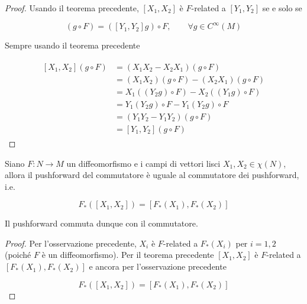 \begin{proof}
	Usando il teorema precedente, $ [X_{1},X_{2}] $ è $ F $-related a $ [Y_{1},Y_{2}] $ se e solo se
	
	\begin{equation}
		[X_{1},X_{2}](g \circ F) = ([Y_{1},Y_{2}] g) \circ F, \qquad \forall g \in C^{\infty}(M)
	\end{equation}

	Sempre usando il teorema precedente
	
	\begin{align}
		\begin{split}
			[X_{1},X_{2}](g \circ F) &= (X_{1} X_{2} - X_{2} X_{1})(g \circ F)\\
			&= (X_{1} X_{2})(g \circ F) - (X_{2} X_{1})(g \circ F)\\
			&= X_{1}((Y_{2} g) \circ F) - X_{2}((Y_{1} g) \circ F)\\
			&= Y_{1}(Y_{2} g) \circ F - Y_{1}(Y_{2} g) \circ F\\
			&= (Y_{1} Y_{2} - Y_{1} Y_{2})(g \circ F)\\
			&= [Y_{1},Y_{2}](g \circ F)
		\end{split}
	\end{align}
\end{proof}

\begin{corollary}\label{frel-brack}
	Siano $ F : N \to M $ un diffeomorfismo e i campi di vettori lisci $ X_{1},X_{2} \in \chi(N) $, allora il pushforward del commutatore è uguale al commutatore dei pushforward, i.e.
	
	\begin{equation}
		F_{*} ([X_{1},X_{2}]) = [F_{*} (X_{1}),F_{*} (X_{2})]
	\end{equation}

	Il pushforward commuta dunque con il commutatore.
\end{corollary}

\begin{proof}
	Per l'osservazione precedente, $ X_{i} $ è $ F $-related a $ F_{*}(X_{i}) $ per $ i=1,2 $ (poiché $ F $ è un diffeomorfismo). Per il teorema precedente $ [X_{1},X_{2}] $ è $ F $-related a $ [F_{*} (X_{1}),F_{*} (X_{2})] $ e ancora per l'osservazione precedente
	
	\begin{equation}
		F_{*} ([X_{1},X_{2}]) = [F_{*} (X_{1}),F_{*} (X_{2})]
	\end{equation}
\end{proof}